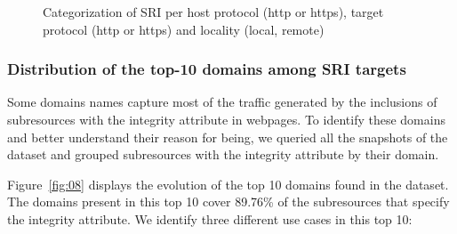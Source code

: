 \documentclass[sigconf,table]{acmart}
\begin{document}
\begin{figure}[h]
\begin{tikzpicture}
\end{tikzpicture}
\caption{Categorization of SRI per host protocol (http or https), target protocol (http or https) and locality (local, remote)}
\label{fig:07}
\end{figure}



\subsubsection{Distribution of the top-10 domains among SRI targets}

Some domains names capture most of the traffic generated by the inclusions of subresources with the integrity attribute in webpages.
To identify these domains and better understand their reason for being, we queried all the snapshots of the \CCSRI dataset and grouped subresources with the integrity attribute by their domain.


Figure~\ref{fig:08} displays the evolution of the top 10 domains found in the \CCSRI dataset.
The domains present in this top 10 cover \num{89.76}\% of the subresources that specify the integrity attribute. 
We identify three different use cases in this top 10:
\end{document}
